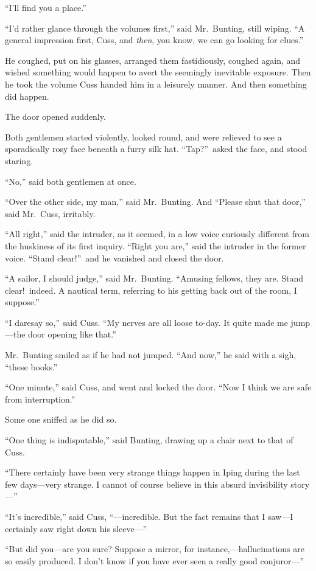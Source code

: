 “I’ll find you a place.”

“I’d rather glance through the volumes first,” said Mr.\ Bunting, still wiping. “A general impression first, Cuss, and \emph{then}, you know, we can go looking for clues.”

He coughed, put on his glasses, arranged them fastidiously, coughed again, and wished something would happen to avert the seemingly inevitable exposure. Then he took the volume Cuss handed him in a leisurely manner. And then something did happen.

The door opened suddenly.

Both gentlemen started violently, looked round, and were relieved to see a sporadically rosy face beneath a furry silk hat. “Tap?”\ asked the face, and stood staring.

“No,” said both gentlemen at once.

“Over the other side, my man,” said Mr.\ Bunting. And “Please shut that door,” said Mr.\ Cuss, irritably.

“All right,” said the intruder, as it seemed, in a low voice curiously different from the huskiness of its first inquiry. “Right you are,” said the intruder in the former voice. “Stand clear!”\ and he vanished and closed the door.

“A sailor, I should judge,” said Mr.\ Bunting. “Amusing fellows, they are. Stand clear!\ indeed. A nautical term, referring to his getting back out of the room, I suppose.”

“I daresay so,” said Cuss. “My nerves are all loose to-day. It quite made me jump—the door opening like that.”

Mr.\ Bunting smiled as if he had not jumped. “And now,” he said with a sigh, “these books.”

“One minute,” said Cuss, and went and locked the door. “Now I think we are safe from interruption.”

Some one sniffed as he did so.

“One thing is indisputable,” said Bunting, drawing up a chair next to that of Cuss.

“There certainly have been very strange things happen in Iping during the last few days—very strange. I cannot of course believe in this absurd invisibility story—”

“It’s incredible,” said Cuss, “—incredible. But the fact remains that I saw—I certainly saw right down his sleeve—”

“But did you—are you sure? Suppose a mirror, for instance,—hallucinations are so easily produced. I don’t know if you have ever seen a really good conjuror—”

